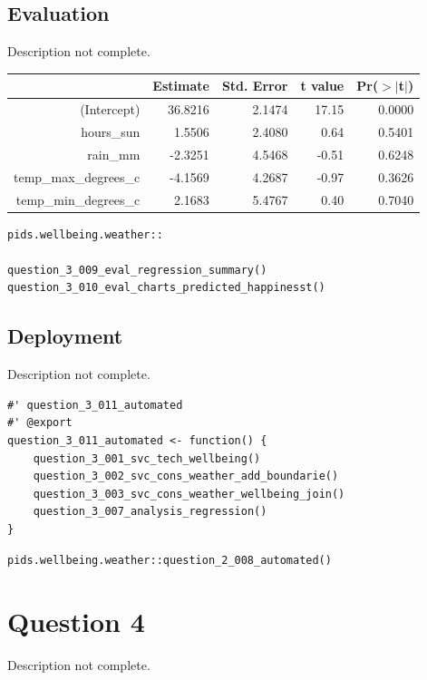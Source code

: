 \documentclass[12pt, oneside, openany]{book}
\begin{document}
\section*{Evaluation}
\color{red}Description not complete\color{black}.

\begin{table}[ht]
	\centering
	\begin{tabular}{rrrrr}
		\hline
		& Estimate & Std. Error & t value & Pr($>$$|$t$|$) \\ 
		\hline
		(Intercept) & 36.8216 & 2.1474 & 17.15 & 0.0000 \\ 
		hours\_sun & 1.5506 & 2.4080 & 0.64 & 0.5401 \\ 
		rain\_mm & -2.3251 & 4.5468 & -0.51 & 0.6248 \\ 
		temp\_max\_degrees\_c & -4.1569 & 4.2687 & -0.97 & 0.3626 \\ 
		temp\_min\_degrees\_c & 2.1683 & 5.4767 & 0.40 & 0.7040 \\ 
		\hline
	\end{tabular}
\end{table}

\bigskip
\begin{lstlisting}
pids.wellbeing.weather::

question_3_009_eval_regression_summary()
question_3_010_eval_charts_predicted_happinesst()
\end{lstlisting}

\section*{Deployment}
\color{red}Description not complete\color{black}.

\begin{lstlisting}
#' question_3_011_automated
#' @export
question_3_011_automated <- function() {
	question_3_001_svc_tech_wellbeing()
	question_3_002_svc_cons_weather_add_boundarie()
	question_3_003_svc_cons_weather_wellbeing_join()
	question_3_007_analysis_regression()
}
\end{lstlisting}

\begin{lstlisting}
pids.wellbeing.weather::question_2_008_automated()
\end{lstlisting}

\setcounter{equation}{0}
\chapter*{Question 4}
\color{red}Description not complete\color{black}.
\end{document}
